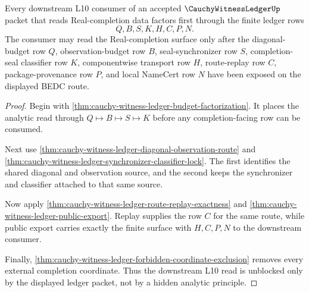 \begin{theorem}
\label{thm:cauchy-witness-ledger-downstream-unblock-package}
Every downstream L10 consumer of an accepted $\CauchyWitnessLedgerUp$ packet
that reads Real-completion data factors first through the finite ledger rows
$$
Q,B,S,K,H,C,P,N.
$$
The consumer may read the Real-completion surface only after the
diagonal-budget row $Q$, observation-budget row $B$, seal-synchronizer row
$S$, completion-seal classifier row $K$, componentwise transport row $H$,
route-replay row $C$, package-provenance row $P$, and local NameCert row $N$
have been exposed on the displayed BEDC route.
\end{theorem}
\begin{proof}
Begin with \autoref{thm:cauchy-witness-ledger-budget-factorization}. It places
the analytic read through $Q \longmapsto B \longmapsto S \longmapsto K$ before
any completion-facing row can be consumed.

Next use \autoref{thm:cauchy-witness-ledger-diagonal-observation-route} and
\autoref{thm:cauchy-witness-ledger-synchronizer-classifier-lock}. The first
identifies the shared diagonal and observation source, and the second keeps
the synchronizer and classifier attached to that same source.

Now apply \autoref{thm:cauchy-witness-ledger-route-replay-exactness} and
\autoref{thm:cauchy-witness-ledger-public-export}. Replay supplies the row
$C$ for the same route, while public export carries exactly the finite
surface with $H,C,P,N$ to the downstream consumer.

Finally, \autoref{thm:cauchy-witness-ledger-forbidden-coordinate-exclusion}
removes every external completion coordinate. Thus the downstream L10 read is
unblocked only by the displayed ledger packet, not by a hidden analytic
principle.
\end{proof}

